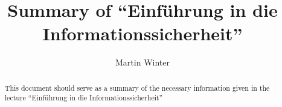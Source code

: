 \documentclass[a4paper, 10 pt, conference]{ieeeconf}
\title{\LARGE \bf Summary of ``Einführung in die Informationssicherheit''}
\author{Martin Winter}
\begin{document}
\maketitle
\thispagestyle{empty}
\pagestyle{empty}


\begin{abstract}

This document should serve as a summary of the necessary information given in the lecture ``Einführung in die Informationssicherheit''

\end{abstract}



\end{document}

